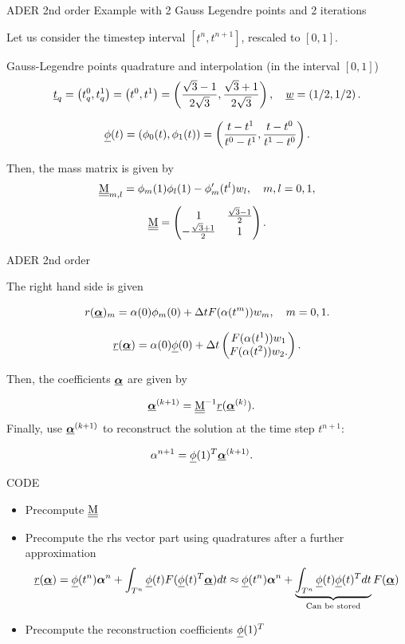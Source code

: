 \documentclass[aspectratio=169]{beamer}
\begin{document}
\begin{frame}{ADER 2nd order}
	Example with 2 Gauss Legendre points and 2 iterations

	Let us consider the timestep interval $[t^n,t^{n+1}]$, rescaled to $[0,1]$. 
	
	Gauss-Legendre points  quadrature and interpolation (in the interval $[0,1]$) 
	\[\underline{t}_q =  \left( t^0_q, t^1_q \right) = \left( t^0, t^1 \right) =  \left( \frac{\sqrt{3}-1}{2\sqrt{3}}, \frac{\sqrt{3}+1}{2\sqrt{3}} \right), \quad \underline{w} = \left(1/2,1/2\right). \]
	
	\[\underline{\phi}(t) = \left( \phi_0(t), \phi_1(t) \right) = \left( \frac{t-t^1}{t^0-t^1}, \frac{t-t^0}{t^1-t^0} \right). \]
	
	Then, the mass matrix is given by
	\[\underline{\underline{\mathrm{M}}}_{m,l} = \phi_m(1)\phi_l(1) - \phi'_m(t^l) w_l, \quad m, l = 0,1,\]
	\[ \underline{\underline{\mathrm{M}}} =
	\begin{pmatrix}
		1   & \frac{\sqrt{3}-1}{2}  \\
		-\frac{\sqrt{3}+1}{2}   & 1
	\end{pmatrix}.\]

\end{frame}

\begin{frame}{ADER 2nd order}

	The right hand side is given 
	
	\[ r(\underline{\boldsymbol{\alpha}})_m = \alpha(0) \phi_m(0) + \Delta t F(\alpha(t^m)) w_m, \quad m=0,1. \] 
	
	\[ \underline{r}(\underline{\boldsymbol{\alpha}}) = \alpha(0)\underline{\phi}(0) +\Delta t
	\begin{pmatrix}
		F(\alpha(t^1)) w_1  \\
		F(\alpha(t^2)) w_2.
	\end{pmatrix}.\]
	
	
	Then, the coefficients $\underline{\boldsymbol{\alpha}}$ are given by
	
	\begin{align*}
		\underline{\boldsymbol{\alpha}}^{(k+1)} &= \underline{\underline{\mathrm{M}}}^{-1} \underline{r}( \underline{\boldsymbol{\alpha}}^{(k)} ).
	\end{align*}
	Finally, use $\underline{\boldsymbol{\alpha}}^{(k+1)}$ to reconstruct the solution at the time step $t^{n+1}$:
	
	\begin{align*}
		\alpha^{n+1} &= \underline{\phi}(1)^T \underline{\boldsymbol{\alpha}}^{(k+1)}.
	\end{align*}
	
	
\end{frame}

\begin{frame}{CODE}
	\begin{itemize}
		\item Precompute $\underline{\underline{\mathrm{M}}}$
		\item Precompute the rhs vector part using quadratures after a further approximation $$\underline{r}(\underline{\boldsymbol{\alpha}}) =  \underline{\phi}(t^{n}) \boldsymbol{\alpha}^n + \int_{T^n} \underline{\phi}(t)  F(\underline{\phi}(t)^T\underline{\boldsymbol{\alpha}})  dt \approx \underline{\phi}(t^{n}) \boldsymbol{\alpha}^n + \underbrace{\int_{T^n} \underline{\phi}(t)\underline{\phi}(t)^Tdt}_{\text{Can be stored}}  F(\underline{\boldsymbol{\alpha}})  $$
		\item Precompute the reconstruction coefficients $\underline{\phi}(1)^T$
	\end{itemize}
\end{frame}
\end{document}
